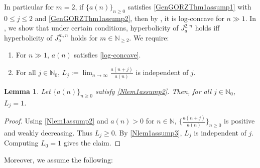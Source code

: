 \documentclass[11pt,reqno,a4paper]{amsart}
\renewcommand{\(}{\left\(}
\renewcommand{\)}{\right\)}
\numberwithin{equation}{section}
\theoremstyle{plain}
\newtheorem{lemma}[theorem]{Lemma}
\theoremstyle{definition} %
\numberwithin{equation}{section}
\begin{document}
In particular for $m=2$, if $\{a(n)\}_{n\ge 0}$ satisfies \ref{GenGORZThm1assump1} with $0\le j\le 2$ and \ref{GenGORZThm1assump2}, then by , it is log-concave for $n\gg 1$. In , we show that under certain conditions, hyperbolicity of $J^{2,n}_a$ holds iff hyperbolicity of $J^{m,n}_a$ holds for $m\in \mathbb{N}_{\ge 2}$. We require: %
\begin{enumerate}[label=(C\arabic*), start=13]
	\item \label{Nlem1assump2} For $n\!\gg\!1$, $a(n)$ satisfies \eqref{log-concave}.
	\item \label{Nlem1assump3} For all $j\in \mathbb{N}_0$, $L_j:=\lim_{n\to \infty}\frac{a(n+j)}{a(n)}$ is independent of $j$.
\end{enumerate}
\begin{lemma}\label{Nlem1}
 Let $\{a(n)\}_{n\ge 0}$ satisfy {\rm{\ref{Nlem1assump2}}}. %
Then, for all $j\in \mathbb{N}_0$, $L_j=1$.
\end{lemma}
\begin{proof}
Using \ref{Nlem1assump2} and $a(n)>0$ for $n\in \mathbb{N}$,
$\{\frac{a(n+j)}{a(n)}\}_{n\ge 0}$ is positive and weakly decreasing. Thus 
$L_j\ge 0$. By \ref{Nlem1assump3}, $L_j$ is independent of $j$. Computing $L_0=1$ gives the claim.
\end{proof}
 Moreover, we assume the following:
\end{document}
